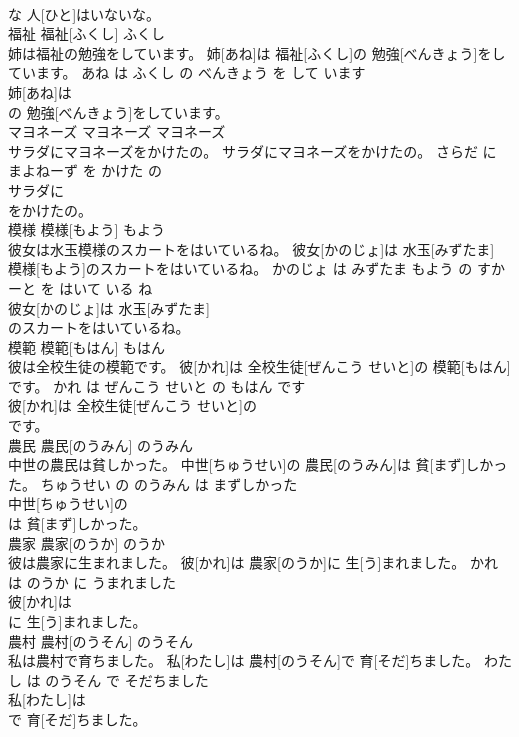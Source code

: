 \documentclass[8pt]{extreport}
\begin{document}
\begin{CJK}{UTF8}{min}
\\	な 人[ひと]はいないな。			
\\	福祉	福祉[ふくし]	ふくし	
\\	姉は福祉の勉強をしています。	姉[あね]は 福祉[ふくし]の 勉強[べんきょう]をしています。	あね は ふくし の べんきょう を して います	
\\	姉[あね]は
\\	の 勉強[べんきょう]をしています。			
\\	マヨネーズ	マヨネーズ	マヨネーズ	
\\	サラダにマヨネーズをかけたの。	サラダにマヨネーズをかけたの。	さらだ に まよねーず を かけた の	
\\	サラダに
\\	をかけたの。			
\\	模様	模様[もよう]	もよう	
\\	彼女は水玉模様のスカートをはいているね。	彼女[かのじょ]は 水玉[みずたま] 模様[もよう]のスカートをはいているね。	かのじょ は みずたま もよう の すかーと を はいて いる ね	
\\	彼女[かのじょ]は 水玉[みずたま]
\\	のスカートをはいているね。			
\\	模範	模範[もはん]	もはん	
\\	彼は全校生徒の模範です。	彼[かれ]は 全校生徒[ぜんこう せいと]の 模範[もはん]です。	かれ は ぜんこう せいと の もはん です	
\\	彼[かれ]は 全校生徒[ぜんこう せいと]の
\\	です。			
\\	農民	農民[のうみん]	のうみん	
\\	中世の農民は貧しかった。	中世[ちゅうせい]の 農民[のうみん]は 貧[まず]しかった。	ちゅうせい の のうみん は まずしかった	
\\	中世[ちゅうせい]の
\\	は 貧[まず]しかった。			
\\	農家	農家[のうか]	のうか	
\\	彼は農家に生まれました。	彼[かれ]は 農家[のうか]に 生[う]まれました。	かれ は のうか に うまれました	
\\	彼[かれ]は
\\	に 生[う]まれました。			
\\	農村	農村[のうそん]	のうそん	
\\	私は農村で育ちました。	私[わたし]は 農村[のうそん]で 育[そだ]ちました。	わたし は のうそん で そだちました	
\\	私[わたし]は
\\	で 育[そだ]ちました。			

\end{CJK}
\end{document}
